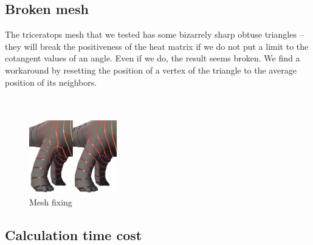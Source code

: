 \documentclass[a4paper,12pt,twoside]{article}
\begin{document}
\subsection{Broken mesh}


The triceratops mesh that we tested has some bizarrely sharp obtuse triangles – they will break the positiveness of the heat matrix if we do not put a limit to the cotangent values of an angle. Even if we do, the result seems broken. We find a workaround by resetting the position of a vertex of the triangle to the average position of its neighbors.\\\\\\

\begin{figure}[htb]
	\centering
	\includegraphics[width=0.34\textwidth]{P3.png}
	\caption{Mesh fixing}
\end{figure}

\subsection{Calculation time cost}
\end{document}
